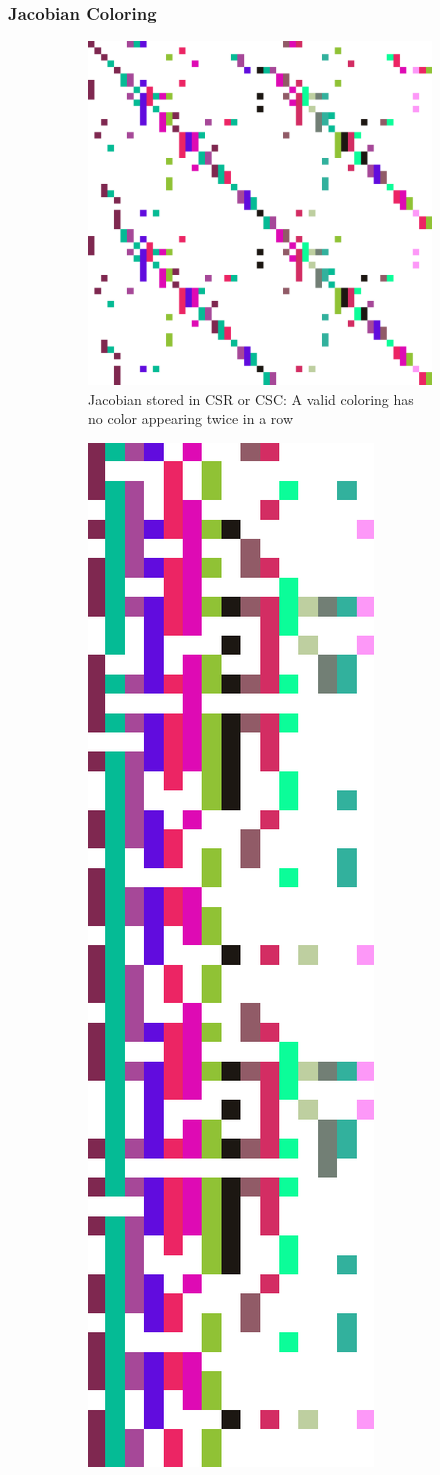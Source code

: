 \begin{frame}
  \frametitle{Jacobian Coloring}
  \begin{center}
    \begin{figure}
\centering
     \begin{subfigure}[b]{0.35\linewidth}
         \centering
         \includegraphics[height=\textwidth]{figures/sparse_coloring.PNG}
         \caption{Jacobian stored in CSR or CSC: A valid coloring has no color appearing twice in a row}
     \end{subfigure}
     \hspace{0.05\linewidth}
     \begin{subfigure}[b]{0.35\linewidth}
         \centering
         \includegraphics[height=\linewidth]{figures/compressed_coloring.PNG}

\end{subfigure}
\end{figure}
\end{center}
\end{frame}
